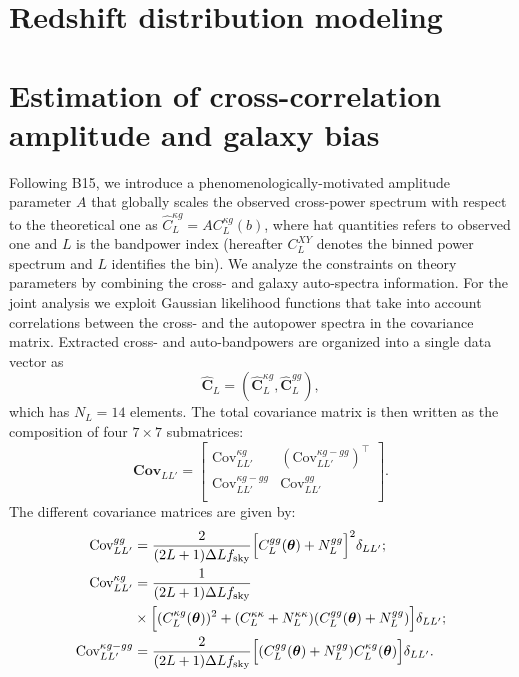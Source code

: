 \documentclass[prd,showpacs,amsfonts,amssymb,amsmath, nofootinbib]{revtex4-1}
\begin{document}
\section{Redshift distribution modeling}



\section{Estimation of cross-correlation amplitude and galaxy bias}

Following B15, we introduce a phenomenologically-motivated amplitude parameter $A$ that globally scales the observed cross-power spectrum with respect to the theoretical one as $\hat{C}^{\kappa g}_{L}=AC^{\kappa g}_{L}(b)$, where hat quantities refers to observed one and $L$ is the bandpower index  (hereafter $C^{XY}_{L}$ denotes the binned power spectrum and  $L$ identifies the bin).
We analyze the constraints on theory parameters by combining the cross- and galaxy auto-spectra information. For the joint analysis we exploit Gaussian likelihood functions that take into account correlations between the cross- and the autopower spectra in the covariance matrix. Extracted cross- and auto-bandpowers are organized into a single data vector as
%
\begin{equation}
\mathbf{\hat{C}}_{L} = (\mathbf{\hat{C}}^{\kappa g}_{L}, \mathbf{\hat{C}}^{gg}_{L}),
\end{equation}
%
which has $N_L=14$ elements. The total covariance matrix is then written as the composition of four $7\times7$ submatrices:
%
\begin{equation}
\textbf{Cov}_{LL'} =
\begin{bmatrix}
\text{Cov}^{\kappa g}_{LL'} & (\text{Cov}^{\kappa g-gg}_{LL'})^\intercal \\
 \text{Cov}^{\kappa g-gg}_{LL'} & \text{Cov}^{gg}_{LL'}  \\
\end{bmatrix}.
\end{equation}
%
The different covariance matrices are given by: 
%
\begin{equation}
\label{eqn:covs}
\begin{split}
{\text{Cov}}^{gg}_{LL'} &= \frac{2}{(2L+1)\Delta L f_{\rm sky}}\Bigl[C_{L}^{gg}(\boldsymbol{\theta}) + N_{L}^{gg}\Bigr]^2\delta_{LL'}
; \\
{\text{Cov}}^{\kappa g}_{LL'} &= \frac{1}{(2L+1)\Delta L f_{\rm sky}} \\ 
&\times\Bigl[(C_{L}^{\kappa g}(\boldsymbol{\theta}))^2 + (C_{L}^{\kappa\kappa} + N_{L}^{\kappa\kappa})(C_{L}^{gg}(\boldsymbol{\theta}) + N_{L}^{gg})\Bigr] \delta_{LL'} ; \\
{\text{Cov}}^{\kappa g-gg}_{LL'} &= \frac{2}{(2L+1)\Delta L f_{\rm sky}} \Bigl [(C^{gg}_{L}(\boldsymbol{\theta})+N^{gg}_{L})C^{\kappa g}_{L}(\boldsymbol{\theta}) \Bigr] \delta_{LL'}.
\end{split}
\end{equation}
\end{document}
